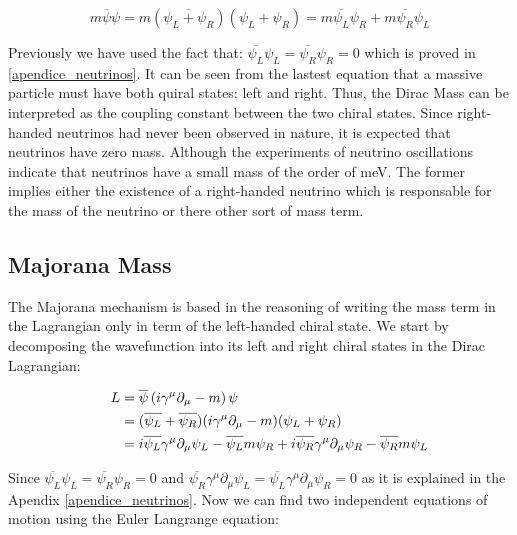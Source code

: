 \begin{equation}\label{Dirac mass term}
 m \overline{\psi} \psi = m \left( \overbar{\psi_L + \psi_R} \right) \left( \psi_L + \psi_R \right) = m \overline{\psi_L} \psi_R + m \overline{\psi_R}\psi_L
\end{equation} 

Previously we have used the fact that: $\overline{\psi_L}\psi_L = \overline{\psi_R}\psi_R = 0$ which is proved in \ref{apendice_neutrinos}. It can be seen from the lastest equation
that a massive particle must have both quiral states: left and right. Thus, the Dirac Mass can be interpreted as the coupling constant between the two chiral states. Since right-handed 
neutrinos had never been observed in nature, it is expected that neutrinos have zero mass. Although the experiments of neutrino oscillations indicate that neutrinos have a small mass of the order of meV. The former implies either the existence of a right-handed neutrino which is responsable for the mass of the neutrino or there other sort of mass term.

\subsection{Majorana Mass}


The Majorana mechanism is based in the reasoning of writing the mass term in the Lagrangian only in term of the left-handed chiral state. We start by decomposing the wavefunction into its left and right chiral states in the Dirac Lagrangian: 


\begin{align}
  \phantom{i = j = k}
  &\begin{aligned}
    \mathllap{L} &= \overline{\psi} \left( i \gamma ^\mu \partial_{\mu} - m \right) \psi \\
    \mathllap{}  &= (\overline{\psi_L} + \overline{\psi_R})( i \gamma ^\mu \partial_{\mu} - m)(\psi_L + \psi_R) \\
     \mathllap{} &= i \overline{\psi_L}\gamma^\mu\partial_\mu \psi_L - \overline{\psi_L} m \psi_R +
     i\overline{\psi_R}\gamma^\mu \partial_\mu \psi_R - \overline{\psi_R}m\psi_L
   &\end{aligned}
\end{align}

Since $\overline{\psi_L}\psi_L = \overline{\psi_R}\psi_R = 0$ and $\overline{\psi_R}\gamma^\mu \partial_\mu \psi_L = \overline{\psi_L}\gamma^\mu\partial_\mu \psi_R = 0$ as it is explained in the Apendix \ref{apendice_neutrinos}. Now we can find two independent equations of motion using the Euler Langrange equation:

